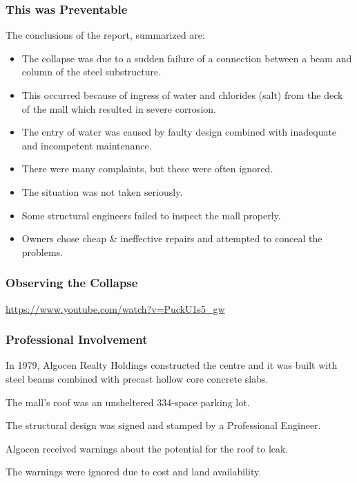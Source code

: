 \begin{frame}
\frametitle{This was Preventable}

The conclusions of the report, summarized are:
\begin{itemize}
	\item The collapse was due to a sudden failure of a connection between a beam and column of the steel substructure.
	\item This occurred because of ingress of water and chlorides (salt) from the deck of the mall which resulted in severe corrosion.
	\item The entry of water was caused by faulty design combined with inadequate and incompetent maintenance.
	\item There were many complaints, but these were often ignored.
	\item The situation was not taken seriously. 
	\item Some structural engineers failed to inspect the mall properly.
	\item Owners chose cheap \& ineffective repairs and attempted to conceal the problems.
\end{itemize}


\end{frame}



\begin{frame}
\frametitle{Observing the Collapse}

\begin{center}
\url{https://www.youtube.com/watch?v=PuckU1s5_gw}
\end{center}

\end{frame}



\begin{frame}
\frametitle{Professional Involvement}

In 1979, Algocen Realty Holdings constructed the centre and it was built with steel beams combined with precast hollow core concrete slabs.

The mall's roof was an unsheltered 334-space parking lot.

The structural design was signed and stamped by a Professional Engineer. 

Algocen received warnings about the potential for the roof to leak.

The warnings were ignored due to cost and land availability.

\end{frame}



